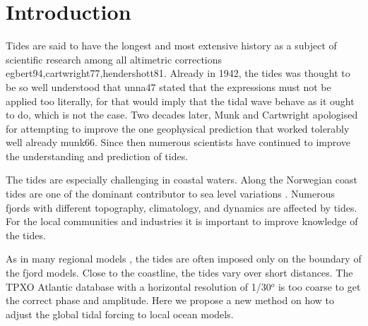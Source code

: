 \section{Introduction}

Tides are said to have the longest and most extensive history as a subject of scientific research among all altimetric corrections \cite{}{egbert94,cartwright77,hendershott81}. Already in 1942, the tides was thought to be so well understood that \cite{}{unna47} stated that the expressions must not be applied too literally, for that would imply that the tidal wave behave as it ought to do, which is not the case. Two decades later, Munk and Cartwright apologised for attempting to improve the one geophysical prediction that worked tolerably well already \cite{}{munk66}. Since then numerous scientists have continued to improve the understanding and prediction of tides. 

The tides are especially challenging in coastal waters. Along the Norwegian coast tides are one of the dominant contributor to sea level variations \cite[]{grabbe09}. Numerous fjords with different topography, climatology, and dynamics are affected by tides. For the local communities and industries it is important to improve knowledge of the tides. 

As in many regional models \cite[]{gjevik89}, the tides are often imposed only on the boundary of the fjord models. Close to the coastline, the tides vary over short distances. The TPXO Atlantic database with a horizontal resolution of 1/30$^o$ \cite[]{egbert94,egbert02} is too coarse to get the correct phase and amplitude. Here we propose a new method on how to adjust the global tidal forcing to local ocean models. 
